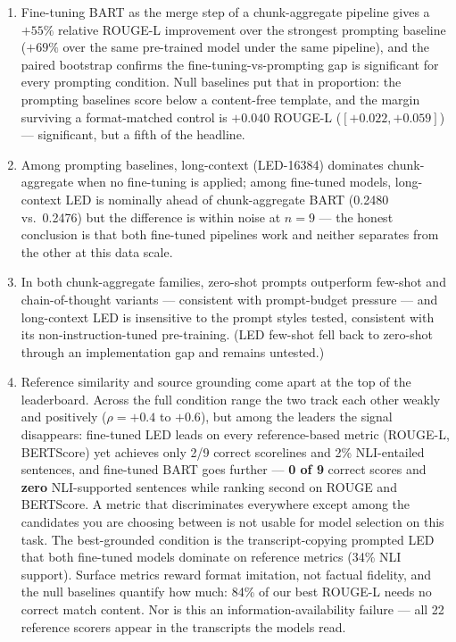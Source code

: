 \documentclass[10pt,a4paper]{article}
\begin{document}
\begin{enumerate}[leftmargin=*,itemsep=2pt,topsep=2pt]
\item Fine-tuning BART as the merge step of a chunk-aggregate pipeline gives a $+55\%$ relative ROUGE-L improvement over the strongest prompting baseline ($+69\%$ over the same pre-trained model under the same pipeline), and the paired bootstrap confirms the fine-tuning-vs-prompting gap is significant for every prompting condition. Null baselines put that in proportion: the prompting baselines score below a content-free template, and the margin surviving a format-matched control is $+0.040$ ROUGE-L ($[+0.022, +0.059]$) --- significant, but a fifth of the headline.
\item Among prompting baselines, long-context (LED-16384) dominates chunk-aggregate when no fine-tuning is applied; among fine-tuned models, long-context LED is nominally ahead of chunk-aggregate BART (0.2480 vs.\ 0.2476) but the difference is within noise at $n=9$ --- the honest conclusion is that both fine-tuned pipelines work and neither separates from the other at this data scale.
\item In both chunk-aggregate families, zero-shot prompts outperform few-shot and chain-of-thought variants --- consistent with prompt-budget pressure --- and long-context LED is insensitive to the prompt styles tested, consistent with its non-instruction-tuned pre-training. (LED few-shot fell back to zero-shot through an implementation gap and remains untested.)
\item Reference similarity and source grounding come apart at the top of the leaderboard. Across the full condition range the two track each other weakly and positively ($\rho = +0.4$ to $+0.6$), but among the leaders the signal disappears: fine-tuned LED leads on every reference-based metric (ROUGE-L, BERTScore) yet achieves only 2/9 correct scorelines and 2\% NLI-entailed sentences, and fine-tuned BART goes further --- \textbf{0 of 9} correct scores and \textbf{zero} NLI-supported sentences while ranking second on ROUGE and BERTScore. A metric that discriminates everywhere except among the candidates you are choosing between is not usable for model selection on this task. The best-grounded condition is the transcript-copying prompted LED that both fine-tuned models dominate on reference metrics (34\% NLI support). Surface metrics reward format imitation, not factual fidelity, and the null baselines quantify how much: 84\% of our best ROUGE-L needs no correct match content. Nor is this an information-availability failure --- all 22 reference scorers appear in the transcripts the models read.
\end{enumerate}
\end{document}
